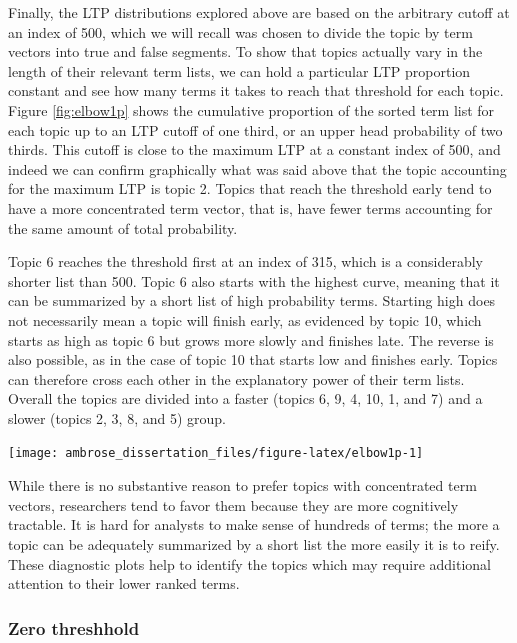 \documentclass[]{book}
\theoremstyle{definition}
\theoremstyle{definition}
\theoremstyle{definition}
\theoremstyle{remark}
\begin{document}
Finally, the LTP distributions explored above are based on the arbitrary
cutoff at an index of 500, which we will recall was chosen to divide the
topic by term vectors into true and false segments. To show that topics
actually vary in the length of their relevant term lists, we can hold a
particular LTP proportion constant and see how many terms it takes to
reach that threshold for each topic. Figure \ref{fig:elbow1p} shows the
cumulative proportion of the sorted term list for each topic up to an
LTP cutoff of one third, or an upper head probability of two thirds.
This cutoff is close to the maximum LTP at a constant index of 500, and
indeed we can confirm graphically what was said above that the topic
accounting for the maximum LTP is topic 2. Topics that reach the
threshold early tend to have a more concentrated term vector, that is,
have fewer terms accounting for the same amount of total probability.

Topic 6 reaches the threshold first at an index of 315, which is a
considerably shorter list than 500. Topic 6 also starts with the highest
curve, meaning that it can be summarized by a short list of high
probability terms. Starting high does not necessarily mean a topic will
finish early, as evidenced by topic 10, which starts as high as topic 6
but grows more slowly and finishes late. The reverse is also possible,
as in the case of topic 10 that starts low and finishes early. Topics
can therefore cross each other in the explanatory power of their term
lists. Overall the topics are divided into a faster (topics 6, 9, 4, 10,
1, and 7) and a slower (topics 2, 3, 8, and 5) group.

\begin{center}\texttt{[image: ambrose\_dissertation\_files/figure-latex/elbow1p-1]} \end{center}

While there is no substantive reason to prefer topics with concentrated
term vectors, researchers tend to favor them because they are more
cognitively tractable. It is hard for analysts to make sense of hundreds
of terms; the more a topic can be adequately summarized by a short list
the more easily it is to reify. These diagnostic plots help to identify
the topics which may require additional attention to their lower ranked
terms.

\hypertarget{zero-threshhold}{%
\subsubsection{Zero threshhold}\label{zero-threshhold}}
\end{document}
